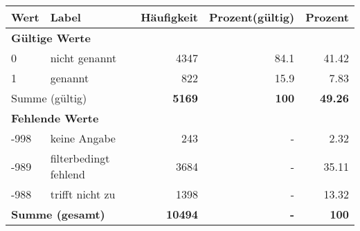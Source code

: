      \begin{longtable}{lXrrr}
     \toprule
     \textbf{Wert} & \textbf{Label} & \textbf{Häufigkeit} & \textbf{Prozent(gültig)} & \textbf{Prozent} \\
     \endhead
     \midrule
     \multicolumn{5}{l}{\textbf{Gültige Werte}}\\

     0 &
     \multicolumn{1}{X}{ nicht genannt   } &


       \num{4347} &
       \num[round-mode=places,round-precision=2]{84,1} &
         \num[round-mode=places,round-precision=2]{41,42} \\

     1 &
     \multicolumn{1}{X}{ genannt   } &


       \num{822} &
       \num[round-mode=places,round-precision=2]{15,9} &
         \num[round-mode=places,round-precision=2]{7,83} \\
     \midrule
     \multicolumn{2}{l}{Summe (gültig)} &
       \textbf{\num{5169}} &
     \textbf{100} &
       \textbf{\num[round-mode=places,round-precision=2]{49,26}} \\
     \multicolumn{5}{l}{\textbf{Fehlende Werte}}\\
       -998 &
       keine Angabe &
         \num{243} &
        - &
         \num[round-mode=places,round-precision=2]{2,32} \\
       -989 &
       filterbedingt fehlend &
         \num{3684} &
        - &
         \num[round-mode=places,round-precision=2]{35,11} \\
       -988 &
       trifft nicht zu &
         \num{1398} &
        - &
         \num[round-mode=places,round-precision=2]{13,32} \\
     \midrule
     \multicolumn{2}{l}{\textbf{Summe (gesamt)}} &
          \textbf{\num{10494}} &
        \textbf{-} &
        \textbf{100} \\
     \bottomrule
     \end{longtable}
     

